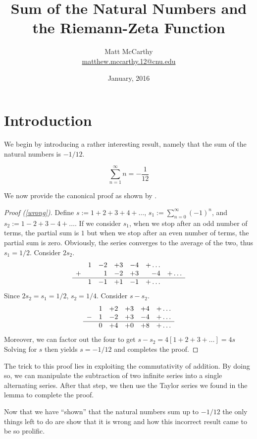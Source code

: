 \documentclass[]{simple}
\title{Sum of the Natural Numbers and the Riemann-Zeta Function}
\date{January, 2016}
\author{Matt McCarthy\\\href{mailto:matthew.mccarthy.12@cnu.edu}{matthew.mccarthy.12@cnu.edu}}
\begin{document}
\maketitle

\section{Introduction}

We begin by introducing a rather interesting result, namely that the sum of the natural numbers is $-1/12$.
\begin{thm}\label{wrong}
	\[
		\sum_{n=1}^\infty n = -\frac{1}{12}
	\]
\end{thm}
We now provide the canonical proof as shown by \cite{wrong-pf}.
\begin{proof}[Proof (\autoref{wrong})]
	Define $s:=1+2+3+4+\ldots$, $s_1:=\sum_{n=0}^\infty(-1)^n$, and $s_2:=1-2+3-4+\ldots$.
	If we consider $s_1$, when we stop after an odd number of terms, the partial sum is $1$ but when we stop after an even number of terms, the partial sum is zero.
	Obviously, the series converges to the average of the two, thus $s_1=1/2$.
	Consider $2s_2$.
	\[
	\begin{array}{rrrrrrr}
		 &1 & -2 &+3 &-4&+\ldots\\
		+&  &1   &-2 &+3&-4&+\ldots\\\hline
		 &1 &-1  &+1 &-1&+\ldots
	\end{array}
	\]
	Since $2s_2=s_1=1/2$, $s_2=1/4$.
	Consider $s-s_2$.
	\[
		\begin{array}{rrrrrr}
			&1&+2&+3&+4&+\ldots\\
			-&1&-2&+3&-4&+\ldots\\\hline
			&0&+4&+0&+8&+\ldots
		\end{array}
	\]
	Moreover, we can factor out the four to get $s-s_2=4[1+2+3+\ldots]=4s$
	Solving for $s$ then yields $s=-1/12$ and completes the proof.
\end{proof}
\begin{analysis}
	The trick to this proof lies in exploiting the commutativity of addition.
	By doing so, we can manipulate the subtraction of two infinite series into a single alternating series.
	After that step, we then use the Taylor series we found in the lemma to complete the proof.
\end{analysis}

Now that we have ``shown'' that the natural numbers sum up to $-1/12$ the only things left to do are show that it is wrong and how this incorrect result came to be so prolific.
\end{document}
